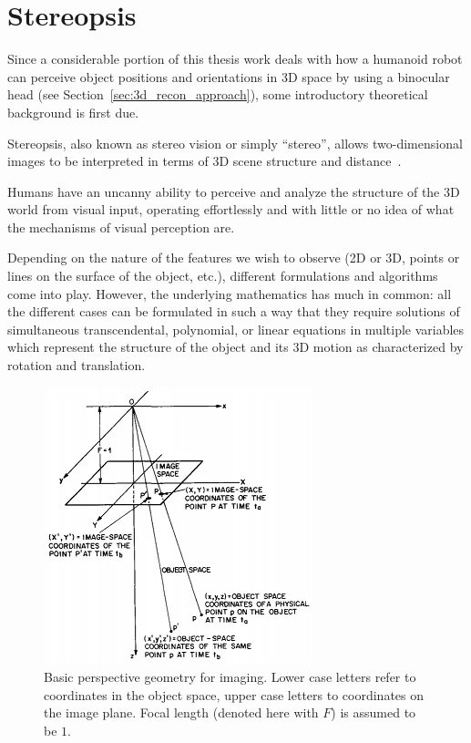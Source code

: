 
\section{Stereopsis}
\label{sec:stereopsis}
 

Since a considerable portion of this thesis work deals with how a humanoid robot can perceive object positions and orientations in 3D space by using a binocular head (see Section~\ref{sec:3d_recon_approach}), some introductory theoretical background is first due.

Stereopsis, also known as stereo vision or simply ``stereo'', allows two-dimensional images to be interpreted in terms of 3D scene structure and distance~\cite{trucco_verri}.

Humans have an uncanny ability to perceive and analyze the structure of the 3D world from visual input, operating effortlessly and with little or no idea of what the mechanisms of visual perception are.

Depending on the nature of the features we wish to observe (2D or 3D, points or lines on the surface of the object, etc.), different formulations and algorithms come into play. However, the underlying mathematics has much in common: all the different cases can be formulated in such a way that they require solutions of simultaneous transcendental, polynomial, or linear equations in multiple variables which represent the structure of the object and its 3D motion as characterized by rotation and translation.

\begin{figure}
\centering
\includegraphics{figures/perspective_geom}
\caption[Perspective geometry for imaging]{Basic perspective geometry for imaging. Lower case letters refer to coordinates in the object space, upper case letters to coordinates on the image plane. Focal length (denoted here with $F$) is assumed to be $1$.}
\label{img:perspective_geom}
\end{figure}

